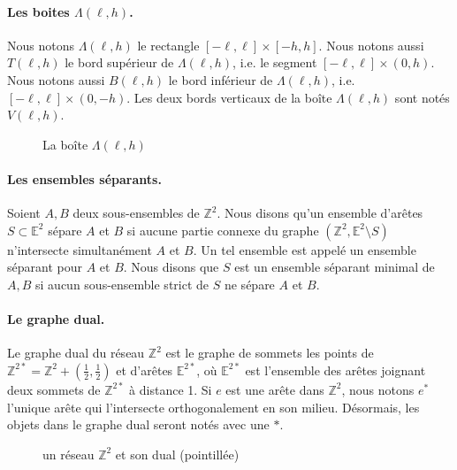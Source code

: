 \documentclass[titlepage,a4paper,12pt]{article}
\begin{document}
\paragraph{Les boites $\Lambda(\ell,h)$.} Nous notons $\Lambda(\ell,h)$ le rectangle $[-\ell,\ell]\times[-h,h]$. Nous notons aussi $T(\ell,h)$ le bord supérieur de $\Lambda(\ell,h)$, i.e. le segment $[-\ell,\ell]\times(0,h)$. Nous notons aussi $B(\ell,h)$ le bord inférieur de $\Lambda(\ell,h)$, i.e. $[-\ell,\ell]\times(0,-h)$. Les deux bords verticaux de la boîte $\Lambda(\ell,h)$ sont notés $V(\ell,h)$.
\begin{figure}[h]
\center
{}
\caption{La boîte $\Lambda(\ell,h)$}
\end{figure}

\paragraph{Les ensembles séparants.} Soient $A,B$ deux sous-ensembles de $\mathbb{Z}^2$. Nous disons qu'un ensemble d'arêtes $S\subset \mathbb{E}^2$ sépare $A$ et $B$ si aucune partie connexe du graphe $(\mathbb{Z}^2,\mathbb{E}^2 \setminus S)$ n'intersecte simultanément $A$ et $B$. Un tel ensemble est appelé un ensemble séparant pour $A$ et $B$. Nous disons que $S$ est un ensemble séparant minimal de $A,B$ si aucun sous-ensemble strict de $S$ ne sépare $A$ et $B$.

\paragraph{Le graphe dual.}Le graphe dual du réseau $\mathbb{Z}^2$ est le graphe de sommets les points de $ \mathbb{Z}^{2*} = \mathbb{Z}^2+(\frac{1}{2},\frac{1}{2})$ et d'arêtes $\mathbb{E}^{2*}$, où $\mathbb{E}^{2*}$ est l'ensemble des arêtes joignant deux sommets de $\mathbb{Z}^{2*}$ à distance 1. Si $e$ est une arête dans $\mathbb{Z}^2$, nous notons $e^*$ l'unique arête qui l'intersecte orthogonalement en son milieu. Désormais, les objets dans le graphe dual seront notés avec une $*$.
\begin{figure}[h]
\center
{}
\caption{un réseau $\mathbb{Z}^2$ et son dual (pointillée)}
\end{figure}
\end{document}
